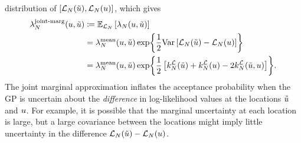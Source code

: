 \documentclass[12pt]{article}
\begin{document}
distribution of $[\llikEm[\Ndesign](\propPar), \llikEm[\Ndesign](\Par)]$, which gives
\begin{align}
\llikEmJointMarg[\Ndesign]{\likRatio}(\Par, \propPar) 
&\Def \E_{\llikEm[\Ndesign]} \left[\Em[\Ndesign]{\likRatio}(\Par, \propPar) \right] \\
&= \llikEmMean[\Ndesign]{\likRatio}(\Par, \propPar)  \Exp{\frac{1}{2} \Var\left[\llikEm[\Ndesign](\propPar) - \llikEm[\Ndesign](\Par) \right]} \\
&=  \llikEmMean[\Ndesign]{\likRatio}(\Par, \propPar)  
\Exp{\frac{1}{2}\left[\emKer[\Ndesign]{\llik}(\propPar) + \emKer[\Ndesign]{\llik}(\Par) - 2\emKer[\Ndesign]{\llik}(\propPar, \Par) \right]}. 
\label{lik_ratio_joint_marg}
\end{align} 
The joint marginal approximation inflates the acceptance probability when the GP is uncertain about the 
\textit{difference} in log-likelihood values at the locations $\propPar$ and $\Par$. For example, it is possible
that the marginal uncertainty at each location is large, but a large covariance between the locations 
might imply little uncertainty in the difference $\llikEm[\Ndesign](\propPar) - \llikEm[\Ndesign](\Par)$. 
\end{document}
